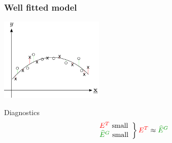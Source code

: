 \begin{frame}\frametitle{Well fitted model} 
	\begin{center}
		\includegraphics[height=4cm]{img/section1_fig29}
	\end{center}

	\begin{block}{Diagnostics}
		$$
			\left. \begin{array}{l}
				{\color{red}E^T} \text{ small} \\
				 {\color{darkgreen}\widehat E^G} \text{ small}
			\end{array} \right \} {\color{red}E^T} \approx {\color{darkgreen}\widehat E^G}
		$$
	\end{block}
\end{frame}


